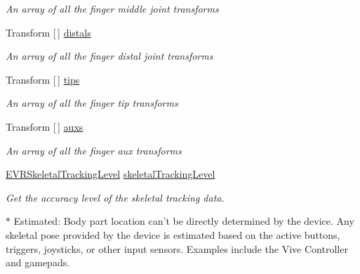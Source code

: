 \begin{DoxyCompactItemize}
\begin{DoxyCompactList}\small\item\em An array of all the finger middle joint transforms \end{DoxyCompactList}\item 
Transform \mbox{[}$\,$\mbox{]} \mbox{\hyperlink{class_valve_1_1_v_r_1_1_steam_v_r___behaviour___skeleton_ac960ca7beab8db157f4213548a00b0a3}{distals}}
\begin{DoxyCompactList}\small\item\em An array of all the finger distal joint transforms \end{DoxyCompactList}\item 
Transform \mbox{[}$\,$\mbox{]} \mbox{\hyperlink{class_valve_1_1_v_r_1_1_steam_v_r___behaviour___skeleton_a1fc2692a4f42280318593cc61c04d9b1}{tips}}
\begin{DoxyCompactList}\small\item\em An array of all the finger tip transforms \end{DoxyCompactList}\item 
Transform \mbox{[}$\,$\mbox{]} \mbox{\hyperlink{class_valve_1_1_v_r_1_1_steam_v_r___behaviour___skeleton_a2807dfb58c0dddf3ff09e1be1f206a1c}{auxs}}
\begin{DoxyCompactList}\small\item\em An array of all the finger aux transforms \end{DoxyCompactList}\item 
\mbox{\hyperlink{namespace_valve_1_1_v_r_a6f46bd50fb65255d6537ab32a6bddc30}{E\+V\+R\+Skeletal\+Tracking\+Level}} \mbox{\hyperlink{class_valve_1_1_v_r_1_1_steam_v_r___behaviour___skeleton_a73ef166ea82f44b56df0e2b842bc131c}{skeletal\+Tracking\+Level}}
\begin{DoxyCompactList}\small\item\em Get the accuracy level of the skeletal tracking data. 

$\ast$ Estimated\+: Body part location can’t be directly determined by the device. Any skeletal pose provided by the device is estimated based on the active buttons, triggers, joysticks, or other input sensors. Examples include the Vive Controller and gamepads. 


\end{DoxyCompactList}
\end{DoxyCompactItemize}

